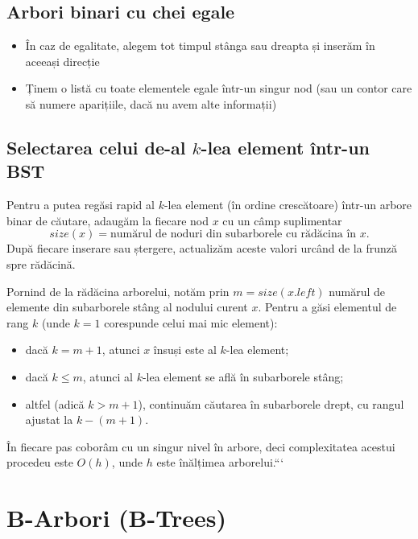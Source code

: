 \documentclass[11pt,a4paper]{article}
\theoremstyle{definition}
\theoremstyle{plain}
\theoremstyle{remark}
\begin{document}
\subsection{Arbori binari cu chei egale}

\begin{itemize}
  \item În caz de egalitate, alegem tot timpul stânga sau dreapta și inserăm în aceeași
direcție
  \item Ținem o listă cu toate elementele egale într-un singur nod (sau un contor care să
numere aparițiile, dacă nu avem alte informații)
\end{itemize}

\subsection{Selectarea celui de-al \(k\)-lea element într-un BST}

Pentru a putea regăsi rapid al \(k\)-lea element (în ordine crescătoare) într-un arbore binar de căutare, adaugăm la fiecare nod \(x\) cu un câmp suplimentar
\[
\mathit{size}(x) = \text{numărul de noduri din subarborele cu rădăcina în }x.
\]
După fiecare inserare sau ștergere, actualizăm aceste valori urcând de la frunză spre rădăcină.

Pornind de la rădăcina arborelui, notăm prin \(m = \mathit{size}(x.\mathit{left})\) numărul de elemente din subarborele stâng al nodului curent \(x\). Pentru a găsi elementul de rang \(k\) (unde \(k=1\) corespunde celui mai mic element):

\begin{itemize}
  \item dacă \(k = m + 1\), atunci \(x\) însuși este al \(k\)-lea element;
  \item dacă \(k \le m\), atunci al \(k\)-lea element se află în subarborele stâng;
  \item altfel (adică \(k > m + 1\)), continuăm căutarea în subarborele drept, cu rangul ajustat la \(k - (m + 1)\).
\end{itemize}

În fiecare pas coborâm cu un singur nivel în arbore, deci complexitatea acestui procedeu este \(O(h)\), unde \(h\) este înălțimea arborelui.```


\section{B-Arbori (B-Trees)}
\end{document}
